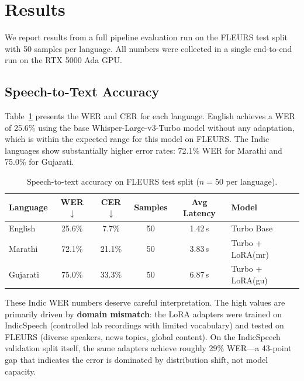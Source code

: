 
\section{Results}
\label{sec:results}

We report results from a full pipeline evaluation run on the FLEURS test split with 50 samples per language. All numbers were collected in a single end-to-end run on the RTX 5000 Ada GPU.

\subsection{Speech-to-Text Accuracy}

Table~\ref{tab:stt_results} presents the WER and CER for each language. English achieves a WER of 25.6\% using the base Whisper-Large-v3-Turbo model without any adaptation, which is within the expected range for this model on FLEURS. The Indic languages show substantially higher error rates: 72.1\% WER for Marathi and 75.0\% for Gujarati.

\begin{table}[t]
\centering
\caption{Speech-to-text accuracy on FLEURS test split ($n = 50$ per language).}
\label{tab:stt_results}
\begin{tabular}{lccccl}
\toprule
\textbf{Language} & \textbf{WER} $\downarrow$ & \textbf{CER} $\downarrow$ & \textbf{Samples} & \textbf{Avg Latency} & \textbf{Model} \\
\midrule
English   & 25.6\% & 7.7\%  & 50 & 1.42\,s & Turbo Base \\
Marathi   & 72.1\% & 21.1\% & 50 & 3.83\,s & Turbo + LoRA(mr) \\
Gujarati  & 75.0\% & 33.3\% & 50 & 6.87\,s & Turbo + LoRA(gu) \\
\bottomrule
\end{tabular}
\end{table}

These Indic WER numbers deserve careful interpretation. The high values are primarily driven by \textbf{domain mismatch}: the LoRA adapters were trained on IndicSpeech (controlled lab recordings with limited vocabulary) and tested on FLEURS (diverse speakers, news topics, global content). On the IndicSpeech validation split itself, the same adapters achieve roughly 29\% WER---a 43-point gap that indicates the error is dominated by distribution shift, not model capacity.


